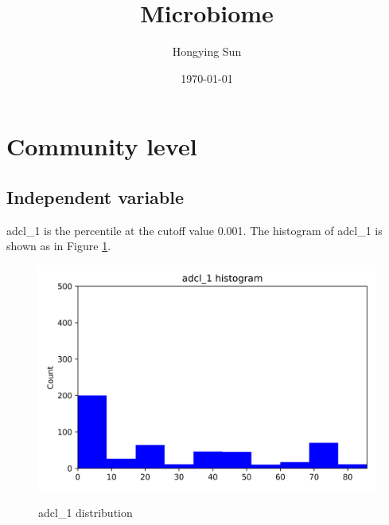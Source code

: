 \documentclass{article}
\title{Microbiome}
\author{Hongying Sun
	}
\date{\today}
\begin{document}
\maketitle

\section{Community level}
\subsection{Independent variable}
adcl_1 is the percentile at the cutoff value 0.001. The histogram of adcl_1 is shown as in Figure \ref{adcl_1-communitylevel}.
\begin{figure}[htbp]
	\centering
	\includegraphics[width=\textwidth, keepaspectratio]{adcl_1-communitylevel.png}\\
	\caption{adcl_1 distribution}
	\label{adcl_1-communitylevel}
\end{figure}
\end{document}
